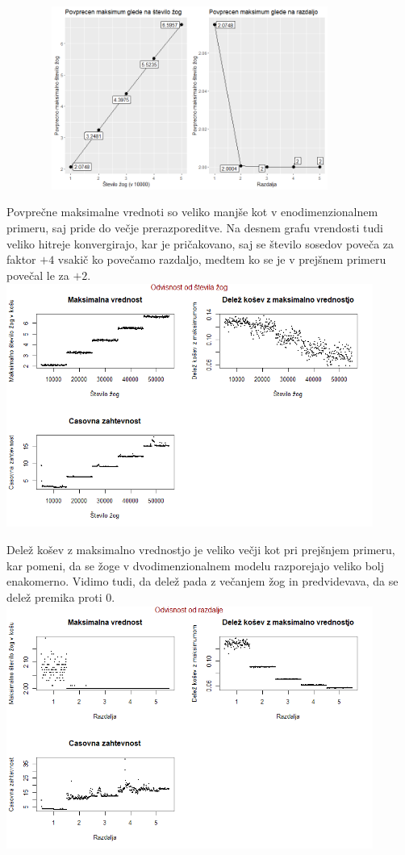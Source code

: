 \documentclass[a4paper, 11pt]{article}
\begin{document}
\includegraphics[width=12cm, height=6cm]{povprecje_2dim1.png}

Povprečne maksimalne vrednoti so veliko manjše kot v enodimenzionalnem primeru, saj pride do večje prerazporeditve. Na desnem grafu vrendosti tudi veliko hitreje konvergirajo, kar je pričakovano, saj se število sosedov poveča za faktor $+4$ vsakič ko povečamo razdaljo, 
medtem ko se je v prejšnem primeru povečal le za $+2$.
\bigbreak
\includegraphics[width=12cm, height= 8cm]{dim2_glede_na_stevilo_zog1.png}

Delež košev z maksimalno vrednostjo je veliko večji kot pri prejšnjem primeru, kar pomeni, da se žoge v dvodimenzionalnem modelu razporejajo veliko bolj enakomerno. Vidimo tudi, da delež pada z večanjem žog in predvidevava, da se delež premika proti $0$.
\bigbreak
\includegraphics[width=12cm, height= 8cm]{dim2_glede_na_razdaljo1.png}
\end{document}
